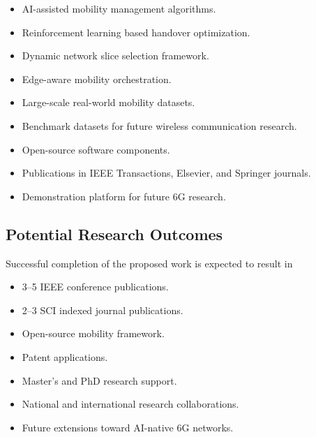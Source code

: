 \documentclass[12pt,a4paper]{article}\usepackage[a4paper,margin=1in]{geometry}\usepackage{graphicx}\usepackage{longtable}\usepackage{booktabs}\usepackage{hyperref}\usepackage{enumitem}\usepackage{amsmath}\usepackage{tikz}\usepackage{pgfgantt}\usepackage{setspace}\setstretch{1.15}\usetikzlibrary{positioning,arrows.meta,shapes.geometric}
\begin{document}
	\begin{itemize}
		
		\item AI-assisted mobility management algorithms.
		
		\item Reinforcement learning based handover optimization.
		
		\item Dynamic network slice selection framework.
		
		\item Edge-aware mobility orchestration.
		
		\item Large-scale real-world mobility datasets.
		
		\item Benchmark datasets for future wireless communication research.
		
		\item Open-source software components.
		
		\item Publications in IEEE Transactions, Elsevier, and Springer journals.
		
		\item Demonstration platform for future 6G research.
		
	\end{itemize}
	
	
	\subsection{Potential Research Outcomes}
	
	Successful completion of the proposed work is expected to result in
	
	\begin{itemize}
		
		\item 3--5 IEEE conference publications.
		
		\item 2--3 SCI indexed journal publications.
		
		\item Open-source mobility framework.
		
		\item Patent applications.
		
		\item Master's and PhD research support.
		
		\item National and international research collaborations.
		
		\item Future extensions toward AI-native 6G networks.
		
	\end{itemize}
	
\end{document}
